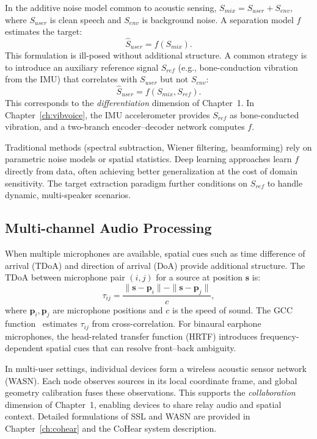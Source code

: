In the additive noise model common to acoustic sensing, $S_{mix} = S_{user} + S_{env}$, where $S_{user}$ is clean speech and $S_{env}$ is background noise. A separation model $f$ estimates the target:
\[
\hat{S}_{user} = f(S_{mix}).
\]
This formulation is ill-posed without additional structure. A common strategy is to introduce an auxiliary reference signal $S_{ref}$ (e.g., bone-conduction vibration from the IMU) that correlates with $S_{user}$ but not $S_{env}$:
\[
\hat{S}_{user} = f(S_{mix}, S_{ref}).
\]
This corresponds to the \textit{differentiation} dimension of Chapter~1. In Chapter~\ref{ch:vibvoice}, the IMU accelerometer provides $S_{ref}$ as bone-conducted vibration, and a two-branch encoder--decoder network computes $f$.

Traditional methods (spectral subtraction, Wiener filtering, beamforming) rely on parametric noise models or spatial statistics. Deep learning approaches learn $f$ directly from data, often achieving better generalization at the cost of domain sensitivity. The target extraction paradigm further conditions on $S_{ref}$ to handle dynamic, multi-speaker scenarios.

\subsection{Multi-channel Audio Processing}

When multiple microphones are available, spatial cues such as time difference of arrival (TDoA) and direction of arrival (DoA) provide additional structure. The TDoA between microphone pair $(i,j)$ for a source at position $\mathbf{s}$ is:
\[
\tau_{ij} = \frac{\|\mathbf{s} - \mathbf{p}_i\| - \|\mathbf{s} - \mathbf{p}_j\|}{c},
\]
where $\mathbf{p}_i,\mathbf{p}_j$ are microphone positions and $c$ is the speed of sound. The GCC function~\cite{knapp1976generalized} estimates $\tau_{ij}$ from cross-correlation. For binaural earphone microphones, the head-related transfer function (HRTF) introduces frequency-dependent spatial cues that can resolve front--back ambiguity.

In multi-user settings, individual devices form a wireless acoustic sensor network (WASN). Each node observes sources in its local coordinate frame, and global geometry calibration fuses these observations. This supports the \textit{collaboration} dimension of Chapter~1, enabling devices to share relay audio and spatial context. Detailed formulations of SSL and WASN are provided in Chapter~\ref{ch:cohear} and the CoHear system description.

